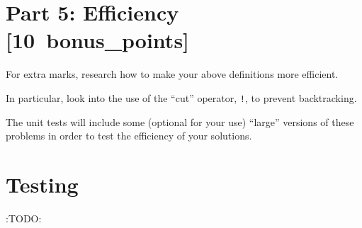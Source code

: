 \documentclass[11pt]{article}
\begin{document}
\section*{Part 5: Efficiency                                     [10 bonus\_points]}
\label{sec:org06bdc57}

For extra marks, research how to make your above definitions more efficient.

In particular, look into the use of the “cut” operator, \texttt{!},
to prevent backtracking.

The unit tests will include some (optional for your use) “large”
versions of these problems in order to test the efficiency
of your solutions.

\section*{Testing}
\label{sec:org12d920a}
:TODO:
\end{document}
